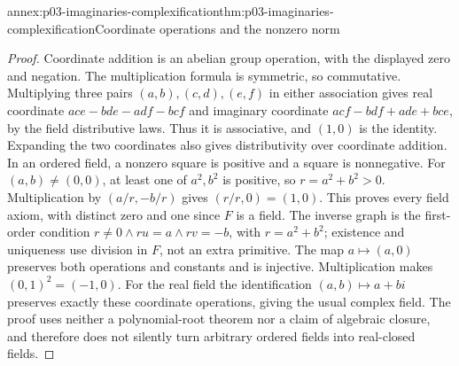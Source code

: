 \begin{annexitem}{annex:p03-imaginaries-complexification}{thm:p03-imaginaries-complexification}{Coordinate operations and the nonzero norm}
\begin{proof}
Coordinate addition is an abelian group operation, with the displayed zero
and negation. The multiplication formula is symmetric, so commutative.
Multiplying three pairs \((a,b),(c,d),(e,f)\) in either association gives
real coordinate \(ace-bde-adf-bcf\) and imaginary coordinate
\(acf-bdf+ade+bce\), by the field distributive laws. Thus it is
associative, and \((1,0)\) is the identity. Expanding the two coordinates
also gives distributivity over coordinate addition.
In an ordered field, a nonzero square is positive and a square is nonnegative.
For \((a,b)\ne(0,0)\), at least one of \(a^2,b^2\) is positive,
so \(r=a^2+b^2>0\). Multiplication by \((a/r,-b/r)\) gives
\((r/r,0)=(1,0)\). This proves every field axiom, with distinct zero and
one since \(F\) is a field. The inverse graph is the first-order condition
\(r\ne0\land ru=a\land rv=-b\), with \(r=a^2+b^2\);
existence and uniqueness use division in \(F\), not an extra primitive.
The map \(a\mapsto(a,0)\) preserves both operations and constants and is
injective. Multiplication makes \((0,1)^2=(-1,0)\).
For the real field the identification \((a,b)\mapsto a+bi\) preserves
exactly these coordinate operations, giving the usual complex field.
The proof uses neither a polynomial-root theorem nor a claim of algebraic
closure, and therefore does not silently turn arbitrary ordered fields into
real-closed fields.
\end{proof}
\end{annexitem}


